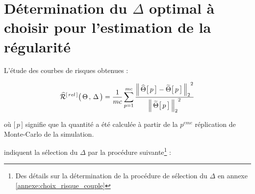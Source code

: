 % 
% 
% 
\section{Détermination du $\Delta$ optimal à choisir pour l'estimation de la régularité}
\label{sec:determination-delta}

\noindent L'étude des courbes de risques obtenues :

\begin{equation}
\widehat{\mathcal R}^{[\,rel\,]} \bigl( \, \Theta \, , \, \Delta \, \bigr)
= 
\frac 1 {mc} \sum\limits_{p=1}^{mc} \frac{{\distnorme 2 {\widehat \Theta\bigl[\, p \,\bigr]} {\widetilde \Theta \bigl[ \,p \,\bigr]}}^2}{{\norme 2 {\widetilde \Theta \bigl[ \,p \,\bigr]}}^2}
\end{equation}

\smallskip
où $\bigl[\, p \,\bigr]$ signifie que la quantité a été calculée à partir de la $p^{eme}$ réplication de Monte-Carlo de la simulation.

\bigskip

indiquent la sélection du $\Delta$ par la procédure suivante\footnote{Des détails sur la détermination de la procédure de sélection du $\Delta$ en annexe \ref{annexe:choix_risque_couple}} :

